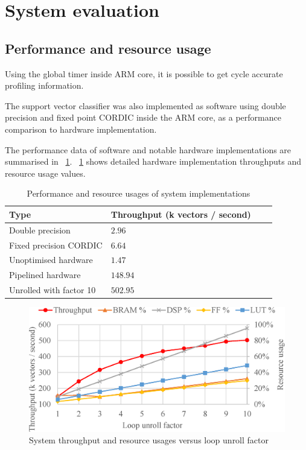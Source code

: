 \documentclass[journal]{IEEEtran}
\newcommand{\fref}[1]{\figurename~\ref{#1}}
\newcommand{\tref}[1]{\tablename~\ref{#1}}
\begin{document}
\section{System evaluation}

\subsection{Performance and resource usage}

Using the global timer inside ARM core, it is possible to get cycle accurate profiling information.

The support vector classifier was also implemented as software using double precision and fixed point CORDIC inside the ARM core, as a performance comparison to hardware implementation.

The performance data of software and notable hardware implementations are summarised in \tref{tbl:throughput}. \fref{fig:throughput} shows detailed hardware implementation throughputs and resource usage values.

\begin{table}[ht]
	\renewcommand{\arraystretch}{1.3}
	\caption{Performance and resource usages of system implementations}
	\label{tbl:throughput}
	\centering
	\begin{tabular}{llll}
		\hline
		Type			& Throughput (k vectors / second)	\\
		\hline
		Double precision	& $2.96$	\\
		Fixed precision CORDIC	& $6.64$	\\
		\hline
		Unoptimised hardware	& $1.47$	\\
		Pipelined hardware	& $148.94$	\\
		Unrolled with factor 10	& $502.95$	\\
		\hline
	\end{tabular}
\end{table}

\begin{figure}[t]
	\centering
	\includegraphics[width=\columnwidth]{throughput}
	\caption{System throughput and resource usages versus loop unroll factor}
	\label{fig:throughput}
\end{figure}
\end{document}
